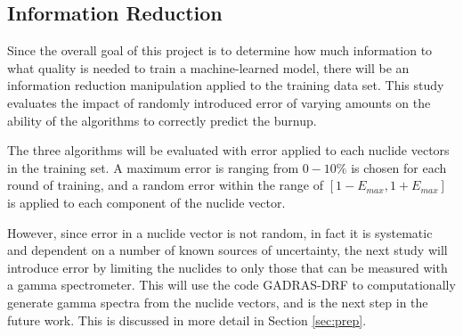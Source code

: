 \subsection{Information Reduction}
\label{sec:inforeduc}

Since the overall goal of this project is to determine how much information to
what quality is needed to train a machine-learned model, there will be an 
information reduction manipulation applied to the training data set. This study 
evaluates the impact of randomly introduced error of varying amounts on the 
ability of the algorithms to correctly predict the burnup. 

The three algorithms will be evaluated with error applied to each nuclide
vectors in the training set.  A maximum error is ranging from $0 - 10\%$ is
chosen for each round of training, and a random error within the range of
$[1-E_{max}, 1+E_{max}]$ is applied to each component of the nuclide vector.

However, since error in a nuclide vector is not random, in fact it is
systematic and dependent on a number of known sources of uncertainty, the next
study will introduce error by limiting the nuclides to only those that can be
measured with a gamma spectrometer. This will use the code \gls{GADRAS-DRF}
\cite{gadras} to computationally generate gamma spectra from the nuclide
vectors, and is the next step in the future work. This is discussed in more
detail in Section \ref{sec:prep}.

